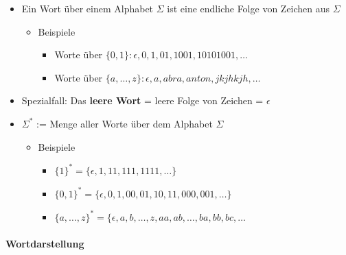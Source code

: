 \documentclass{scrartcl}
\begin{document}
\begin{itemize}
	\item Ein Wort über einem Alphabet $\Sigma$ ist eine endliche Folge von Zeichen aus $\Sigma$
	\begin{itemize}
		\item Beispiele
		\begin{itemize}
			\item Worte über $\{ 0,1 \}: \epsilon,0,1,01,1001,10101001, \ldots$
			\item Worte über $\{ a,\ldots,z \}: \epsilon,a,abra,anton,jkjhkjh,\ldots$
		\end{itemize}
	\end{itemize}
	\item Spezialfall: Das \textbf{leere Wort} = leere Folge von Zeichen = $\epsilon$
	\item $\Sigma^*$ := Menge aller Worte über dem Alphabet $\Sigma$
	\begin{itemize}
		\item Beispiele
		\begin{itemize}
			\item $\{ 1 \}^* = \{ \epsilon,1,11,111,1111,\ldots \}$
			\item $\{ 0,1 \}^* = \{ \epsilon,0,1,00,01,10,11,000,001,\ldots \}$
			\item $\{ a,\ldots,z \}^* = \{ \epsilon,a,b,\ldots,z,aa,ab,\ldots,ba,bb,bc,\ldots$
		\end{itemize}
	\end{itemize}
\end{itemize}

\paragraph{Wortdarstellung}
\end{document}
